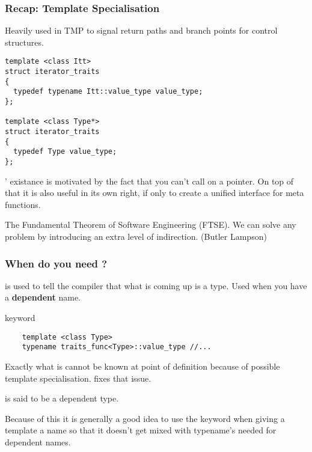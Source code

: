 \documentclass[11pt,a4paper,dvipsnames,usenames]{beamer}
\begin{document}
\begin{frame}[fragile]
  \frametitle{Recap: Template Specialisation}

  \vfill

  Heavily used in TMP to signal return paths and branch points for control structures.

  \vfill

  \begin{exampleblock}{}
  \begin{lstlisting}
template <class Itt>
struct iterator_traits
{
  typedef typename Itt::value_type value_type;
};

template <class Type*>
struct iterator_traits
{
  typedef Type value_type;
};
  \end{lstlisting}

  \note
  {
    ' existance is motivated by the fact that you can't call  on a
    pointer. On top of that it is also useful in its own right, if only to create a unified interface for meta functions.

    \vspace{1em}

    The Fundamental Theorem of Software Engineering (FTSE). We can solve any problem by introducing an extra level of indirection.
    (Butler Lampson)
  }
\end{exampleblock}

  \vfill

\end{frame}

\begin{frame}[fragile]
  \frametitle{When do you need ?}

  \vfill

   is used to tell the compiler that what is coming up is a type. Used when you have 
  a \textbf{dependent} name.

  \vfill

  \begin{exampleblock}{ keyword}
    \begin{lstlisting}
    template <class Type>
    typename traits_func<Type>::value_type //...
    \end{lstlisting}
  \end{exampleblock}

  \vfill

  Exactly what  is cannot be known at point of definition because of possible
  template specialisation.  fixes that issue.

  \vfill

   is said to be a dependent type.

  \note
  {
    Because of this it is generally a good idea to use the  keyword when giving a template 
    a name so that it doesn't get mixed with typename's needed for dependent names.
  }

  \vfill

\end{frame}
\end{document}
